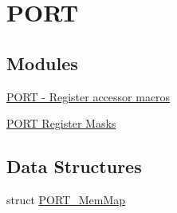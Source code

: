 \hypertarget{group___p_o_r_t___peripheral}{}\section{P\+O\+RT}
\label{group___p_o_r_t___peripheral}
\subsection*{Modules}
\begin{DoxyCompactItemize}
\item 
\hyperlink{group___p_o_r_t___register___accessor___macros}{P\+O\+R\+T -\/ Register accessor macros}
\item 
\hyperlink{group___p_o_r_t___register___masks}{P\+O\+R\+T Register Masks}
\end{DoxyCompactItemize}
\subsection*{Data Structures}
\begin{DoxyCompactItemize}
\item 
struct \hyperlink{struct_p_o_r_t___mem_map}{P\+O\+R\+T\+\_\+\+Mem\+Map}
\end{DoxyCompactItemize}
